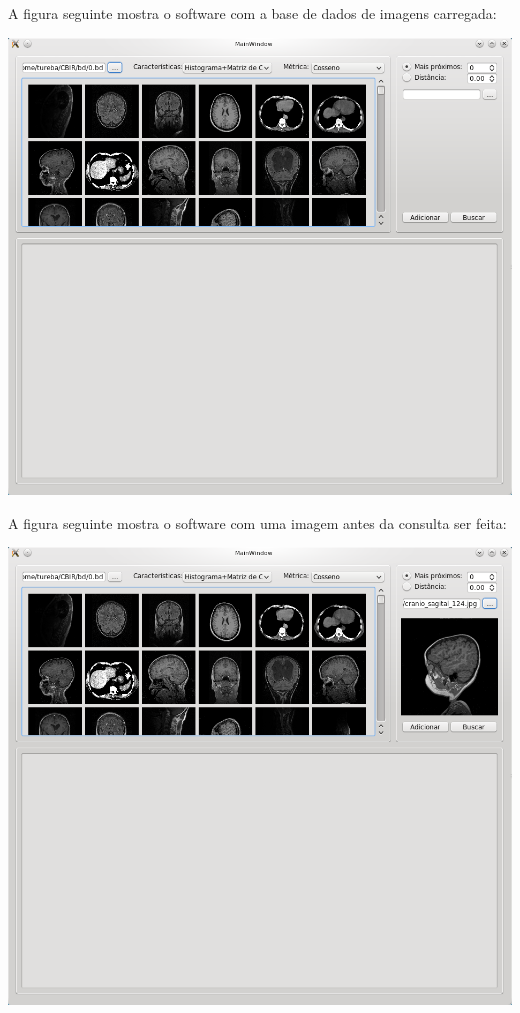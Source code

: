 \documentclass[10pt,a4paper]{article}
\begin{document}
\begin{titlepage}
\begin{multicols}{2}
A figura seguinte mostra o software com a base de dados de imagens carregada:

\includegraphics[scale=0.25]{CBIR_bd.png}

A figura seguinte mostra o software com uma imagem antes da consulta ser feita:

\includegraphics[scale=0.25]{CBIR_imagem.png}



\end{multicols}
\end{titlepage}
\end{document}
